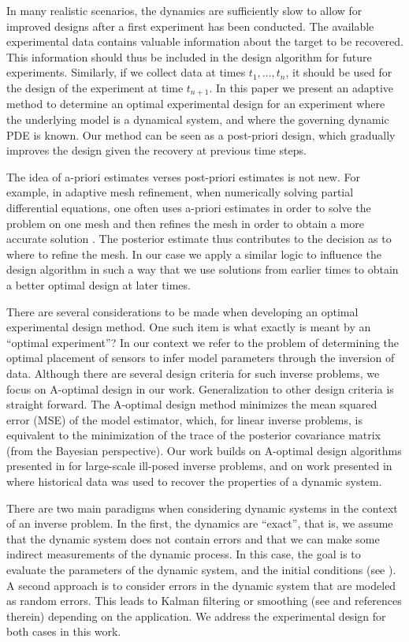 \documentclass[11pt]{article}
\begin{document}
 In many realistic scenarios, the dynamics are sufficiently slow to allow for improved designs after a first experiment has been conducted. The available experimental data contains valuable information about the target to be recovered. This information should thus be included in the design algorithm for future experiments. 
 Similarly, if we  collect data at times $t_{1},\ldots , t_{n}$, it should be used for the design of the experiment at time $t_{n+1}$.
 In this paper we present an adaptive method to determine an optimal experimental design for an experiment where the underlying model is a dynamical system, and  where the governing dynamic PDE is known.
 Our method can be seen as a post-priori design, which gradually improves the design given the recovery at previous time steps. 
  
 The idea of a-priori estimates verses post-priori  estimates is not new. For example, in adaptive mesh refinement, when numerically 
solving partial differential
equations, one often uses a-priori estimates in order to solve the problem on one mesh 
and then refines the mesh in order to obtain a more accurate solution \cite{MultiGrid}. The posterior estimate thus contributes to the decision as to where to refine the mesh. In our case we apply a similar logic to influence the design algorithm in such a way that we use solutions from earlier times to obtain a better optimal design at later times. 


There are several considerations to be made when developing an optimal experimental design method. One such item is what exactly is meant by an ``optimal experiment''? In our context we refer to the problem of determining  the optimal placement of sensors to infer model parameters  through the inversion of  data. 
 Although there are several design criteria for such inverse problems,  we focus on A-optimal design in our work.
 Generalization to other design criteria is straight forward. 
 The A-optimal design method minimizes the mean squared error (MSE) of the model estimator, which, for linear inverse problems, is equivalent to the minimization of  the trace of the posterior covariance matrix (from the Bayesian perspective). Our work  builds on A-optimal design algorithms presented in \cite{Haber2011} for large-scale ill-posed inverse problems, and on work presented in \cite{Fohring2014} where historical data was used
 to recover the properties of a dynamic system. 

There are two main paradigms when considering dynamic systems in the context of an inverse problem. In the
first, the dynamics are ``exact'', that is, we assume that the dynamic system does not contain errors and that we can make some indirect measurements of the dynamic process. In this case,
the goal is to evaluate the parameters of the dynamic system, and the initial conditions (see \cite{Fohring2014}). 
A second approach  is
to consider errors in the dynamic system that are modeled as random errors. This leads to 
Kalman filtering or smoothing (see \cite{kalman1960,Aravkin2010} and references therein) depending on the application.
 We address the experimental design for  both cases in this work. 
\end{document}
